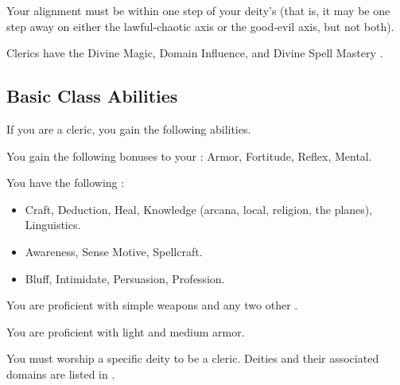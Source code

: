      Your alignment must be within one step of your deity's (that is, it may be one step away on either the lawful-chaotic axis or the good-evil axis, but not both).

     Clerics have the Divine Magic, Domain Influence, and Divine Spell Mastery .

    \subsection{Basic Class Abilities}
        If you are a cleric, you gain the following abilities.

        You gain the following bonuses to your :  Armor,  Fortitude,  Reflex,  Mental.

        You have the following :
        \begin{itemize}
            \item {} Craft, Deduction, Heal, Knowledge (arcana, local, religion, the planes), Linguistics.
            \item {} Awareness, Sense Motive, Spellcraft.
            \item {} Bluff, Intimidate, Persuasion, Profession.
        \end{itemize}

        You are proficient with simple weapons and any two other .

        You are proficient with light and medium armor.

        You must worship a specific deity to be a cleric.
        Deities and their associated domains are listed in .

